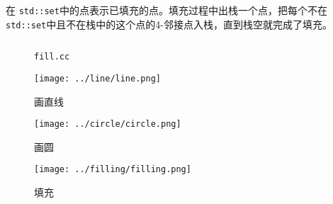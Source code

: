 \documentclass{cumtbrep}
\newcommand\inputcode[3][c++]{%
	\inputminted{#1}{#2}
	\begin{figure}[H]
		\centering
		\captionsetup{type=table}
		\caption{\texttt{#3}}
	\end{figure}
}
\newcommand\inline[1]{\texttt{#1}}
\begin{document}
在 \inline{std::set}中的点表示已填充的点。填充过程中出栈一个点，把每个不在 \inline{std::set}中且不在栈中的这个点的4-邻接点入栈，直到栈空就完成了填充。
\inputcode{../filling/fill.cc}{fill.cc}

\analysesec
\begin{figure}[H]
	\centering
	\texttt{[image: ../line/line.png]}
	\caption{画直线}
\end{figure}
\begin{figure}[H]
	\centering
	\texttt{[image: ../circle/circle.png]}
	\caption{画圆}
\end{figure}
\begin{figure}[H]
	\centering
	\texttt{[image: ../filling/filling.png]}
	\caption{填充}
\end{figure}

\maketail
\end{document}
